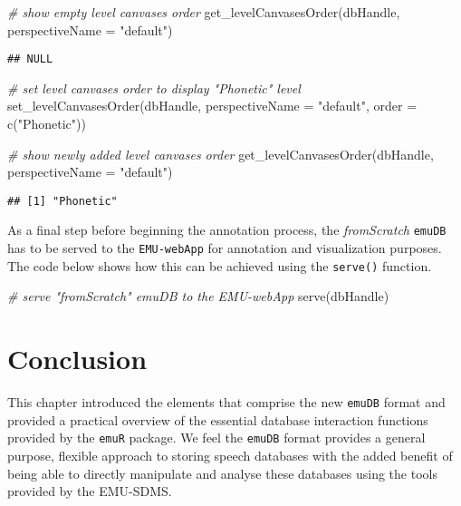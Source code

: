 \documentclass[
]{book}
\newenvironment{Shaded}{\begin{snugshade}}{\end{snugshade}}
\newcommand{\AttributeTok}[1]{\textcolor[rgb]{0.77,0.63,0.00}{#1}}
\newcommand{\CommentTok}[1]{\textcolor[rgb]{0.56,0.35,0.01}{\textit{#1}}}
\newcommand{\FunctionTok}[1]{\textcolor[rgb]{0.00,0.00,0.00}{#1}}
\newcommand{\NormalTok}[1]{#1}
\newcommand{\StringTok}[1]{\textcolor[rgb]{0.31,0.60,0.02}{#1}}
\begin{document}
\begin{Shaded}
\begin{Highlighting}[]
\CommentTok{\# show empty level canvases order}
\FunctionTok{get\_levelCanvasesOrder}\NormalTok{(dbHandle, }\AttributeTok{perspectiveName =} \StringTok{"default"}\NormalTok{)}
\end{Highlighting}
\end{Shaded}

\begin{verbatim}
## NULL
\end{verbatim}

\begin{Shaded}
\begin{Highlighting}[]
\CommentTok{\# set level canvases order to display "Phonetic" level}
\FunctionTok{set\_levelCanvasesOrder}\NormalTok{(dbHandle,}
                       \AttributeTok{perspectiveName =} \StringTok{"default"}\NormalTok{,}
                       \AttributeTok{order =} \FunctionTok{c}\NormalTok{(}\StringTok{"Phonetic"}\NormalTok{))}

\CommentTok{\# show newly added level canvases order}
\FunctionTok{get\_levelCanvasesOrder}\NormalTok{(dbHandle, }\AttributeTok{perspectiveName =} \StringTok{"default"}\NormalTok{)}
\end{Highlighting}
\end{Shaded}

\begin{verbatim}
## [1] "Phonetic"
\end{verbatim}

As a final step before beginning the annotation process, the \emph{fromScratch} \texttt{emuDB} has to be served to the \texttt{EMU-webApp} for annotation and visualization purposes. The code below shows how this can be achieved using the \texttt{serve()} function.

\begin{Shaded}
\begin{Highlighting}[]
\CommentTok{\# serve "fromScratch" emuDB to the EMU{-}webApp}
\FunctionTok{serve}\NormalTok{(dbHandle)}
\end{Highlighting}
\end{Shaded}

\hypertarget{conclusion-2}{%
\section{Conclusion}\label{conclusion-2}}

This chapter introduced the elements that comprise the new \texttt{emuDB} format and provided a practical overview of the essential database interaction functions provided by the \texttt{emuR} package. We feel the \texttt{emuDB} format provides a general purpose, flexible approach to storing speech databases with the added benefit of being able to directly manipulate and analyse these databases using the tools provided by the EMU-SDMS.
\end{document}
